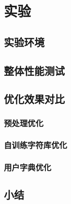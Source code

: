 \chapter{实验}
\label{chap:experiments}

\section{实验环境}

\section{整体性能测试}

\section{优化效果对比}
\subsection{预处理优化}

\subsection{自训练字符库优化}

\subsection{用户字典优化}

\section{小结}
